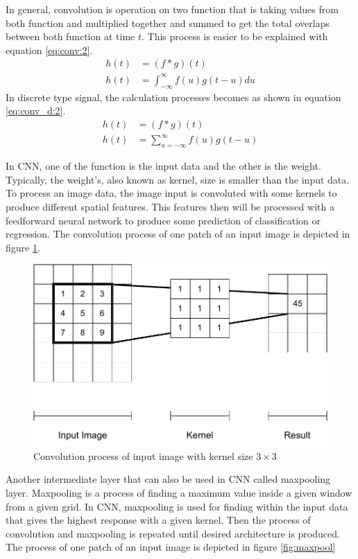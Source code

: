     In general, convolution is operation on two function that is
    taking values from both function and multiplied together and
    summed to get the total overlaps between both function at time
    $t$. This process is easier to be explained with equation
    \ref{eq:conv:2}.
    \begin{align}
        \label{eq:conv:1}
        h(t) &= (f * g)(t)\\
        \label{eq:conv:2}
        h(t) &= \int_{-\infty}^\infty f(u)g(t-u) du
    \end{align}
    In discrete type signal, the calculation processes becomes as
    shown in equation \ref{eq:conv_d:2}.
    \begin{align}
        \label{eq:conv_d:1}
        h(t) &= (f * g)(t)\\
        \label{eq:conv_d:2}
        h(t) &= \sum_{u = -\infty}^{\infty} f(u)g(t-u)
    \end{align}

    In CNN, one of the function is the input data and the other is the
    weight. Typically, the weight's, also known as kernel, size is
    smaller than the input data. To process an image data, the image
    input is convoluted with some kernels to produce different spatial
    features. This features then will be processed with a feedforward
    neural network to produce some prediction of classification or
    regression. The convolution process of one patch of an input image
    is depicted in figure \ref{fig:convolution}.
    
    \begin{figure}
        \centering
        \includegraphics[width=.6\linewidth]{images/convolution.pdf}
        \caption{Convolution process of input image with kernel size $3\times3$}
        \label{fig:convolution}
    \end{figure}
    
    Another intermediate layer that can also be used in CNN called
    maxpooling layer. Maxpooling is a process of finding a maximum
    value inside a given window from a given grid. In CNN, maxpooling
    is used for finding within the input data that gives the highest
    response with a given kernel. Then the process of convolution and
    maxpooling is repeated until desired architecture is produced. The
    process of one patch of an input image is depicted in figure \ref{fig:maxpool}

